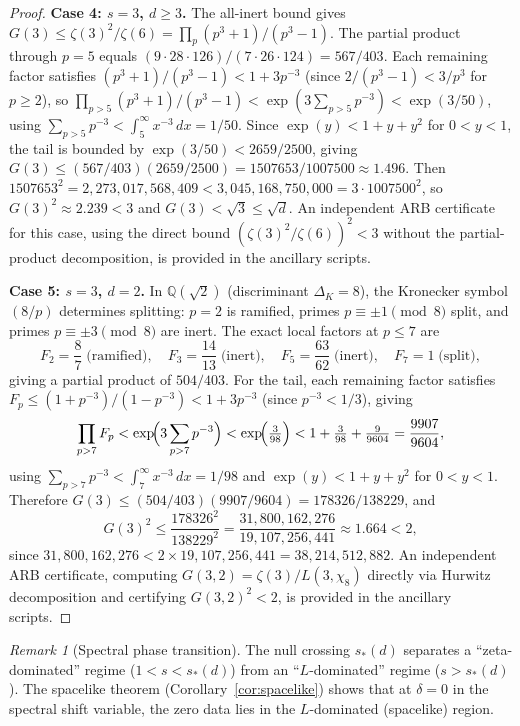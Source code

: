 \documentclass[12pt,reqno]{amsart}
\theoremstyle{plain}
\theoremstyle{definition}
\theoremstyle{remark}
\newtheorem{remark}[theorem]{Remark}
\newcommand{\Q}{\mathbb{Q}}
\begin{document}
\begin{proof}
\medskip\noindent\textbf{Case 4: $s = 3$, $d \geq 3$.}
The all-inert bound gives $G(3) \leq \zeta(3)^2/\zeta(6) = \prod_p (p^3+1)/(p^3-1)$.  The partial product through $p = 5$ equals $(9 \cdot 28 \cdot 126)/(7 \cdot 26 \cdot 124) = 567/403$.  Each remaining factor satisfies $(p^3+1)/(p^3-1) < 1 + 3p^{-3}$ (since $2/(p^3-1) < 3/p^3$ for $p \geq 2$), so $\prod_{p > 5}(p^3+1)/(p^3-1) < \exp(3\sum_{p>5} p^{-3}) < \exp(3/50)$, using $\sum_{p>5} p^{-3} < \int_5^\infty x^{-3}\,dx = 1/50$.  Since $\exp(y) < 1 + y + y^2$ for $0 < y < 1$, the tail is bounded by $\exp(3/50) < 2659/2500$, giving $G(3) \leq (567/403)(2659/2500) = 1507653/1007500 \approx 1.496$.  Then $1507653^2 = 2{,}273{,}017{,}568{,}409 < 3{,}045{,}168{,}750{,}000 = 3 \cdot 1007500^2$, so $G(3)^2 \approx 2.239 < 3$ and $G(3) < \sqrt{3} \leq \sqrt{d}$.  An independent ARB certificate for this case, using the direct bound $(\zeta(3)^2/\zeta(6))^2 < 3$ without the partial-product decomposition, is provided in the ancillary scripts.

\medskip\noindent\textbf{Case 5: $s = 3$, $d = 2$.}
In $\Q(\sqrt{2})$ (discriminant $\Delta_K = 8$), the Kronecker symbol $(8/p)$ determines splitting: $p = 2$ is ramified, primes $p \equiv \pm 1 \pmod{8}$ split, and primes $p \equiv \pm 3 \pmod{8}$ are inert.  The exact local factors at $p \leq 7$ are
\[
  F_2 = \frac{8}{7}\;\text{(ramified)}, \quad
  F_3 = \frac{14}{13}\;\text{(inert)}, \quad
  F_5 = \frac{63}{62}\;\text{(inert)}, \quad
  F_7 = 1\;\text{(split)},
\]
giving a partial product of $504/403$.  For the tail, each remaining factor satisfies $F_p \leq (1+p^{-3})/(1-p^{-3}) < 1 + 3p^{-3}$ (since $p^{-3} < 1/3$), giving
\[
  \prod_{p > 7} F_p < \exp\!\Bigl(3\sum_{p>7} p^{-3}\Bigr)
  < \exp\!\Bigl(\tfrac{3}{98}\Bigr)
  < 1 + \tfrac{3}{98} + \tfrac{9}{9604} = \frac{9907}{9604},
\]
using $\sum_{p>7} p^{-3} < \int_7^\infty x^{-3}\,dx = 1/98$ and $\exp(y) < 1 + y + y^2$ for $0 < y < 1$.  Therefore $G(3) \leq (504/403)(9907/9604) = 178326/138229$, and
\[
  G(3)^2 \leq \frac{178326^2}{138229^2} = \frac{31{,}800{,}162{,}276}{19{,}107{,}256{,}441} \approx 1.664 < 2,
\]
since $31{,}800{,}162{,}276 < 2 \times 19{,}107{,}256{,}441 = 38{,}214{,}512{,}882$.  An independent ARB certificate, computing $G(3,2) = \zeta(3)/L(3,\chi_8)$ directly via Hurwitz decomposition and certifying $G(3,2)^2 < 2$, is provided in the ancillary scripts.
\end{proof}

\begin{remark}[Spectral phase transition]
The null crossing $s_*(d)$ separates a ``zeta-dominated'' regime ($1 < s < s_*(d)$) from an ``$L$-dominated'' regime ($s > s_*(d)$). The spacelike theorem (Corollary~\ref{cor:spacelike}) shows that at $\delta = 0$ in the spectral shift variable, the zero data lies in the $L$-dominated (spacelike) region.
\end{remark}
\end{document}
